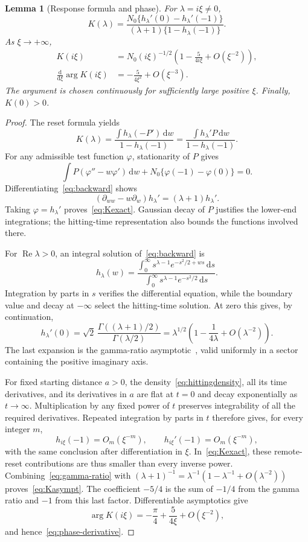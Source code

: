 \documentclass[11pt,a4paper]{article}
\numberwithin{equation}{section}
\newtheorem{lemma}[theorem]{Lemma}
\theoremstyle{remark}\newtheorem{remark}[theorem]{Remark}
\newcommand{\dd}{\,\mathrm d}
\DeclareMathOperator{\Rea}{Re}
\begin{document}
\begin{lemma}[Response formula and phase]\label{lem:response}
For $\lambda=i\xi\ne0$,
\begin{equation}\label{eq:Kexact}
 K(\lambda)=
 \frac{N_0\{h_\lambda'(0)-h_\lambda'(-1)\}}
 {(\lambda+1)\{1-h_\lambda(-1)\}}.
\end{equation}
As $\xi\to+\infty$,
\begin{align}
 K(i\xi)&=N_0(i\xi)^{-1/2}
 \left(1-\frac{5}{4i\xi}+O(\xi^{-2})\right),\label{eq:Kasympt}\\
 \frac{\mathrm d}{\mathrm d\xi}\arg K(i\xi)
 &=-\frac{5}{4\xi^2}+O(\xi^{-3}).\label{eq:phase-derivative}
\end{align}
The argument is chosen continuously for sufficiently large positive $\xi$. Finally, $K(0)>0$.
\end{lemma}
\begin{proof}
The reset formula yields
\[
 K(\lambda)=\frac{\int h_\lambda(-P')\dd w}{1-h_\lambda(-1)}
 =\frac{\int h_\lambda'P\dd w}{1-h_\lambda(-1)}.
\]
For any admissible test function $\varphi$, stationarity of $P$ gives
\[
 \int P(\varphi''-w\varphi')\dd w
 +N_0\{\varphi(-1)-\varphi(0)\}=0.
\]
Differentiating~\eqref{eq:backward} shows
\[
 (\partial_{ww}-w\partial_w)h_\lambda'=(\lambda+1)h_\lambda'.
\]
Taking $\varphi=h_\lambda'$ proves~\eqref{eq:Kexact}. Gaussian decay of $P$ justifies the lower-end integrations; the hitting-time representation also bounds the functions involved there.

For $\Rea\lambda>0$, an integral solution of~\eqref{eq:backward} is
\[
 h_\lambda(w)=
 \frac{\int_0^\infty s^{\lambda-1}e^{-s^2/2+ws}\dd s}
      {\int_0^\infty s^{\lambda-1}e^{-s^2/2}\dd s}.
\]
Integration by parts in $s$ verifies the differential equation, while the boundary value and decay at $-\infty$ select the hitting-time solution. At zero this gives, by continuation,
\begin{equation}\label{eq:gamma-ratio}
 h_\lambda'(0)=\sqrt2\,
 \frac{\Gamma((\lambda+1)/2)}{\Gamma(\lambda/2)}
 =\lambda^{1/2}\left(1-\frac1{4\lambda}+O(\lambda^{-2})\right).
\end{equation}
The last expansion is the gamma-ratio asymptotic~\cite{dlmf}, valid uniformly in a sector containing the positive imaginary axis.

For fixed starting distance $a>0$, the density~\eqref{eq:hittingdensity}, all its time derivatives, and its derivatives in $a$ are flat at $t=0$ and decay exponentially as $t\to\infty$. Multiplication by any fixed power of $t$ preserves integrability of all the required derivatives. Repeated integration by parts in $t$ therefore gives, for every integer $m$,
\[
 h_{i\xi}(-1)=O_m(\xi^{-m}),\qquad
 h_{i\xi}'(-1)=O_m(\xi^{-m}),
\]
with the same conclusion after differentiation in $\xi$. In~\eqref{eq:Kexact}, these remote-reset contributions are thus smaller than every inverse power. Combining~\eqref{eq:gamma-ratio} with
$(\lambda+1)^{-1}=\lambda^{-1}(1-\lambda^{-1}+O(\lambda^{-2}))$
proves~\eqref{eq:Kasympt}. The coefficient $-5/4$ is the sum of $-1/4$ from the gamma ratio and $-1$ from this last factor. Differentiable asymptotics give
\[
 \arg K(i\xi)=-\frac\pi4+\frac5{4\xi}+O(\xi^{-2}),
\]
and hence~\eqref{eq:phase-derivative}.


\end{proof}
\end{document}
